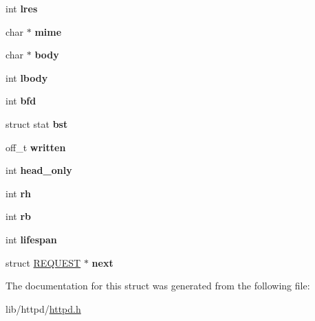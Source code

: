 \begin{DoxyCompactItemize}
\item 
\mbox{\label{structREQUEST_a51431e4cd1a57b66a56a114b130d89e8}} 
int {\bfseries lres}
\item 
\mbox{\label{structREQUEST_a1a5829da8a6051d7d86fdb454880a842}} 
char $\ast$ {\bfseries mime}
\item 
\mbox{\label{structREQUEST_ac18f1048932b4f5b2d14b07e76bc594e}} 
char $\ast$ {\bfseries body}
\item 
\mbox{\label{structREQUEST_a6de2692999bdfe8bb560a6ac55bf4f0a}} 
int {\bfseries lbody}
\item 
\mbox{\label{structREQUEST_a00f3b53e23090d93f1fdc3dd2b3f89fd}} 
int {\bfseries bfd}
\item 
\mbox{\label{structREQUEST_a52eb8dbd37dcb50d6f4cbe07afa1b5a7}} 
struct stat {\bfseries bst}
\item 
\mbox{\label{structREQUEST_a71ec0a2a0f63900cbe4f55c9d34998bd}} 
off\+\_\+t {\bfseries written}
\item 
\mbox{\label{structREQUEST_a45f97d1b901a6cf20b8c1afda8b6f544}} 
int {\bfseries head\+\_\+only}
\item 
\mbox{\label{structREQUEST_aae5661c09d2e7ca38d55ea5b30f1a291}} 
int {\bfseries rh}
\item 
\mbox{\label{structREQUEST_a2fc7edc7016483efbbaf9bc15d9962a7}} 
int {\bfseries rb}
\item 
\mbox{\label{structREQUEST_a3499889dcb97dce4efe1afa465479121}} 
int {\bfseries lifespan}
\item 
\mbox{\label{structREQUEST_a89dad1805a6338683086a0c11e9bf57a}} 
struct \hyperlink{structREQUEST}{R\+E\+Q\+U\+E\+ST} $\ast$ {\bfseries next}
\end{DoxyCompactItemize}


The documentation for this struct was generated from the following file\+:\begin{DoxyCompactItemize}
\item 
lib/httpd/\hyperlink{httpd_8h}{httpd.\+h}\end{DoxyCompactItemize}
